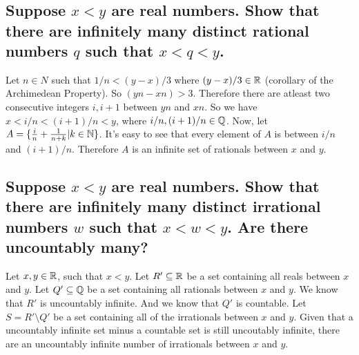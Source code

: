 \section{}
    \subsection{Suppose $x < y$ are real numbers. Show that there are infinitely many distinct
        rational numbers $q$ such that $x < q < y$.}
        Let $n \in N$ such that $1/n < (y - x) / 3$ where $(y - x) / 3 \in \mathbb{R}$
        (corollary of the Archimedean Property).
        So $(yn - xn) > 3$.
        Therefore there are atleast two consecutive integers $i, i+1$ between $yn$ and $xn$.
        So we have $x < i/n < (i+1) / n < y$, where $i/n, (i+1)/n \in \mathbb{Q}$.
        Now, let $A = \{ \frac{i}{n} + \frac{1}{n + k} | k \in \mathbb{N} \}$.
        It's easy to see that every element of $A$ is between $i/n$ and $(i + 1)/n$.
        Therefore $A$ is an infinite set of rationals between $x$ and $y$.

    \subsection{Suppose $x < y$ are real numbers. Show that there are infinitely many distinct
        irrational numbers $w$ such that $x < w < y$. Are there uncountably many?}
        Let $x, y \in \mathbb{R}$, such that $x < y$.
        Let $R' \subseteq \mathbb{R}$ be a set containing all reals between $x$ and $y$.
        Let $Q' \subseteq \mathbb{Q}$ be a set containing all rationals between $x$ and $y$.
        We know that $R'$ is uncountably infinite.
        And we know that $Q'$ is countable.
        Let $S = R' \setminus Q'$ be a set containing all of the irrationals between $x$ and $y$.
        Given that a uncountably infinite set minus a countable set is still uncoutably infinite,
        there are an uncountably infinite number of irrationals between $x$ and $y$.